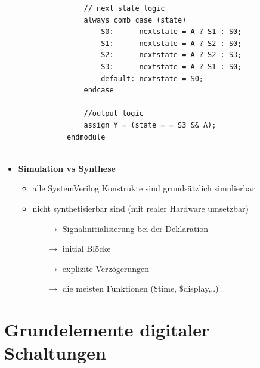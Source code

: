 \documentclass[11pt,a4paper]{article}
\begin{document}
\begin{itemize}
\begin{itemize}
\begin{lstlisting}
			// next state logic
			always_comb case (state)
				S0: 	 nextstate = A ? S1 : S0;
				S1:		 nextstate = A ? S2 : S0;
				S2: 	 nextstate = A ? S2 : S3;
				S3: 	 nextstate = A ? S1 : S0;
				default: nextstate = S0;
			endcase
			
			//output logic
			assign Y = (state = = S3 && A);
		endmodule
				
		\end{lstlisting}
	\end{itemize}
	
\item \textbf{Simulation vs Synthese}
	\begin{itemize}
	\item alle SystemVerilog Konstrukte sind grundsätzlich simulierbar
	\item nicht synthetisierbar sind (mit realer Hardware umsetzbar)
		\begin{itemize}
		\item[$\rightarrow$] Signalinitialisierung bei der Deklaration
		\item[$\rightarrow$] initial Blöcke
		\item[$\rightarrow$] explizite Verzögerungen
		\item[$\rightarrow$] die meisten Funktionen (\$time, \$display,..)
		\end{itemize}		 
	\end{itemize}
\end{itemize}


\section{Grundelemente digitaler Schaltungen}
\end{document}
